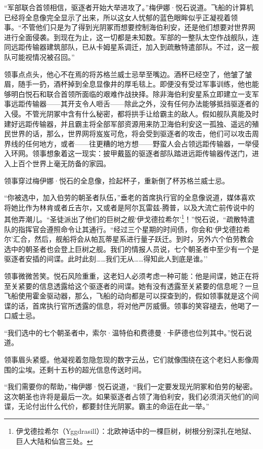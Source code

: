 \documentclass[AutoFakeBold=true]{book}
\begin{document}
``军部联合首领相信，驱逐者开始大举进攻了。''梅伊娜·悦石说道。飞船的计算机已经将全息像完全显示了出来，所以这女人忧郁的蓝色眼眸似乎正凝视着领事。``不管他们只是为了得到光阴冢而想要控制海伯利安，还是他们想要对世界网进行全面侵袭。到现在为止，这一切都是未知数。军部的一整队太空作战舰队，连同远距传输器建筑部队，已从卡姆星系调迁，加入到疏散特遣部队。不过，这一舰队可能视情况被召回。''

领事点点头，他心不在焉的将苏格兰威士忌举至嘴边。酒杯已经空了，他皱了皱眉，随手一扔，酒杯掉到全息显像井的厚毛毯上。即便没有受过军事训练，他也能够明白悦石和联合首领所面临的艰难作战抉择。除非海伯利安星系立即建立一支军事远距传输器——其开支令人咂舌——除此之外，没有任何办法能够抵挡驱逐者的入侵。不管光阴冢中含有什么秘密，都将拱手让给霸主的敌人。假如舰队真能及时建好远距传输器，并且霸主将全部军部资源用来防卫海伯利安这一孤独、遥远的殖民世界的话，那么，世界网将岌岌可危，将会受到驱逐者的攻击，他们可以攻击周界线的任何地方，或者——往更糟的地方想——野蛮人会占领远距传输器，一举侵入环网。领事想象着这一现实：披甲戴盔的驱逐者部队踏进远距传输器传送门，进入上百个世界上毫无防备的家园。

领事穿过梅伊娜·悦石的全息像，捡起杯子，重新倒了杯苏格兰威士忌。

``你被选中，加入伯劳的朝圣者队伍，''垂老的首席执行官的全息像说道，媒体喜欢将她比作为林肯或者丘吉尔，又或者是阿尔瓦雷兹-腾普，以及大流亡前传说中的其他弄潮儿。``圣徒派出了他们的巨树之舰`伊戈德拉希尔'\footnote{伊戈德拉希尔（Yggdrasill）：北欧神话中的一棵巨树，树根分别深扎在地狱、巨人大陆和仙宫三处。}！''悦石说，``疏散特遣队的指挥官会遵照命令让其通行。``经过三个星期的时间债，你会和`伊戈德拉希尔'汇合，然后，舰船将会从帕瓦蒂星系进行量子跃迁。到时，另外六个伯劳教会选中的朝圣者也会登上巨树之舰。我们的情报人员说，七个朝圣者中至少有一个是驱逐者安插的间谍。此时此刻……我们无从……得知此人到底是谁。''

领事微微苦笑。悦石风险重重，这老妇人必须考虑一种可能：他是间谍，她正在将至关紧要的信息透露给这个驱逐者的间谍。她有没有透露至关紧要的信息呢？一旦飞船使用霍金驱动器，那么，飞船的动向都是可以探查到的，假如领事就是这个间谍的话，首席执行官所透露的信息，将对他严厉威慑。领事的笑容褪去，他喝了一口威士忌。

``我们选中的七个朝圣者中，索尔·温特伯和费德曼·卡萨德也位列其中。''悦石说道。

领事眉头紧蹙。他凝视着忽隐忽现的数字云丛，它们就像围绕在这个老妇人影像周围的尘埃。还剩十五秒的超光信息传送时间。

``我们需要你的帮助，''梅伊娜·悦石说道，``我们一定要发现光阴冢和伯劳的秘密。这次朝圣也许将是最后一次。如果驱逐者占领了海伯利安，我们必须消灭他们的间谍，无论付出什么代价，都要封住光阴冢。霸主的命运在此一举。''
\end{document}
